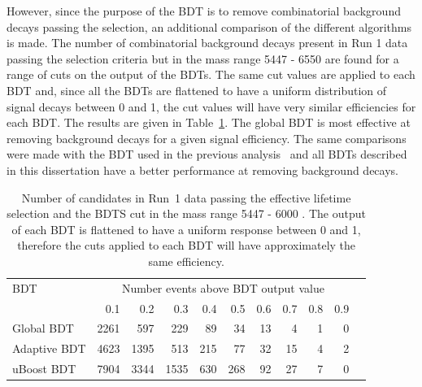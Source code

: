 However, since the purpose of the BDT is to remove combinatorial background decays passing the \bsmumu selection, an additional comparison of the different algorithms is made. The number of combinatorial background decays present in Run 1 data passing the \el selection criteria but in the mass range 5447 - 6550 \mevcc are found for a range of cuts on the output of the BDTs. %
The same cut values are applied to each BDT and, since all the BDTs are flattened to have a uniform distribution of signal decays between 0 and 1, the cut values will have very similar efficiencies for each BDT. %
The results are given in Table~\ref{tab:bkgdsC}. The global BDT is most effective at removing background decays for a given signal efficiency.
The same comparisons were made with the BDT used in the previous analysis~\cite{CMS:2014xfa} and all BDTs described in this dissertation have a better performance at removing background decays. 




\begin{table}[htbp]
\begin{center}
\begin{tabular}{lrrrrrrrrrr}
\toprule \toprule
BDT & \multicolumn{9}{c}{Number events above BDT output value}  \\
\cmidrule{2-10}
   & 0.1 & 0.2 & 0.3 & 0.4 & 0.5 & 0.6 & 0.7 & 0.8 & 0.9 \\ \midrule
Global BDT  & 2261 & 597 & 229 & 89 & 34 & 13 & 4 & 1 & 0 \\ 
Adaptive BDT  & 4623 & 1395 & 513 & 215 & 77 & 32 & 15 & 4 & 2 \\
uBoost BDT & 7904 & 3344 & 1535 &630 & 268 & 92 & 27 & 7 & 0 \\
\bottomrule \bottomrule
\end{tabular}
\vspace{0.7cm}
\vspace{0.7cm}
\caption{Number of candidates in Run~1 data passing the effective lifetime selection and the BDTS cut in the mass range 5447 - 6000 \mevcc. The output of each BDT is flattened to have a uniform response between 0 and 1, therefore the cuts applied to each BDT will have approximately the same efficiency.}
\label{tab:bkgdsC}
\end{center}
\vspace{-1.0cm}
\end{table}


